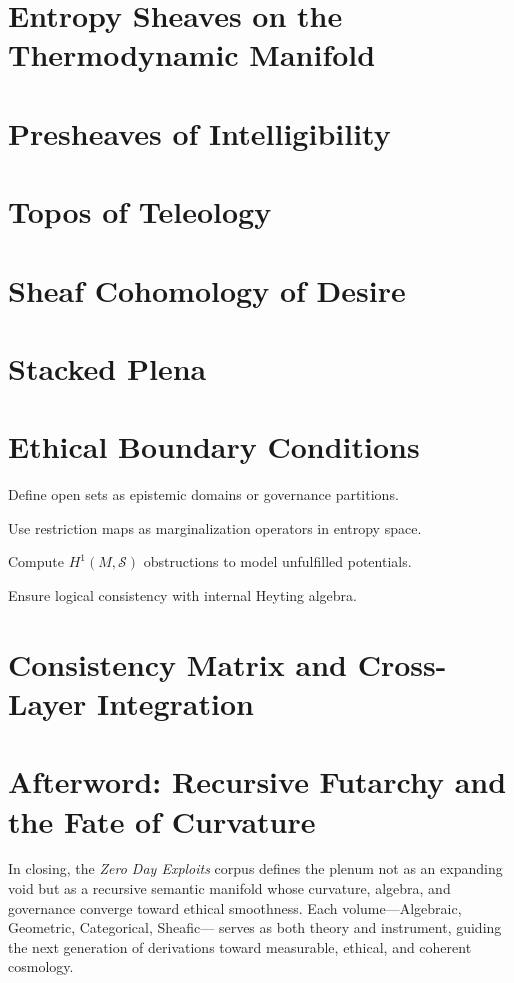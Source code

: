 \documentclass[12pt,oneside]{book}
\begin{document}
\chapter{Entropy Sheaves on the Thermodynamic Manifold}
\chapter{Presheaves of Intelligibility}
\chapter{Topos of Teleology}
\chapter{Sheaf Cohomology of Desire}
\chapter{Stacked Plena}
\chapter{Ethical Boundary Conditions}

\begin{botinstructions}
  \item Define open sets as epistemic domains or governance partitions.
  \item Use restriction maps as marginalization operators in entropy space.
  \item Compute $H^1(M,\mathcal{S})$ obstructions to model unfulfilled potentials.
  \item Ensure logical consistency with internal Heyting algebra.
\end{botinstructions}


\appendix
\chapter*{Consistency Matrix and Cross-Layer Integration}

\backmatter
\chapter*{Afterword: Recursive Futarchy and the Fate of Curvature}

In closing, the \textit{Zero Day Exploits} corpus defines the plenum not as an expanding void
but as a recursive semantic manifold whose curvature, algebra, and governance
converge toward ethical smoothness. Each volume—Algebraic, Geometric, Categorical, Sheafic—
serves as both theory and instrument, guiding the next generation of derivations
toward measurable, ethical, and coherent cosmology.
\end{document}
